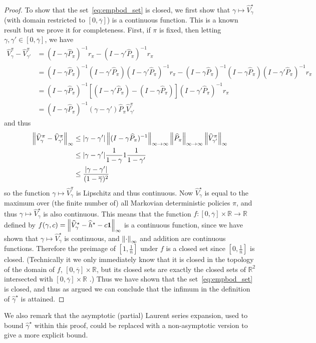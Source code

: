 \documentclass{article}
\theoremstyle{plain}
\theoremstyle{plain}
\theoremstyle{remark}
\theoremstyle{plain}
\theoremstyle{plain}
\newcommand{\R}{\mathbb{R}}
\newcommand{\Phat}{\widehat{P}}
\newcommand{\Vhat}{\widehat{V}}
\newcommand{\one}{\mathbf{1}}
\newcommand{\hhat}{\widehat{h}}
\newcommand{\empbod}{\widehat{\gamma}^\star}
\begin{document}
\begin{proof}
        To show that the set~\eqref{eq:empbod_set} is closed, we first show that $\gamma \mapsto \Vhat^\star_\gamma$ (with domain restricted to $[0, \overline{\gamma}]$) is a continuous function. This is a known result but we prove it for completeness. First, if $\pi$ is fixed, then letting $\gamma, \gamma' \in [0, \overline{\gamma}]$, we have
        \begin{align*}
            \Vhat_\gamma^\pi -  \Vhat_{\gamma'}^\pi &= (I - \gamma \Phat_\pi)^{-1} r_\pi - (I - \gamma' \Phat_\pi)^{-1} r_\pi \\
            &= (I - \gamma \Phat_\pi)^{-1} (I - \gamma' \Phat_\pi) (I - \gamma' \Phat_\pi)^{-1} r_\pi - (I - \gamma \Phat_\pi)^{-1} (I - \gamma \Phat_\pi) (I - \gamma' \Phat_\pi)^{-1} r_\pi \\
            &= (I - \gamma \Phat_\pi)^{-1} \left[(I - \gamma' \Phat_\pi) - (I - \gamma \Phat_\pi) \right] (I - \gamma' \Phat_\pi)^{-1} r_\pi \\
            &= (I - \gamma \Phat_\pi)^{-1} (\gamma - \gamma') \Phat_\pi \Vhat_{\gamma'}^\pi
        \end{align*}
        and thus
        \begin{align*}
            \infnorm{\Vhat_\gamma^\pi -  \Vhat_{\gamma'}^\pi} &\leq |\gamma - \gamma'| \infinfnorm{(I - \gamma \Phat_\pi)^{-1}} \infinfnorm{\Phat_\pi} \infnorm{\Vhat_{\gamma'}^\pi} \\
            &\leq |\gamma - \gamma'| \frac{1}{1-\gamma} 1 \frac{1}{1-\gamma'} \\
            & \leq \frac{|\gamma - \gamma'|}{(1-\overline{\gamma})^2}
        \end{align*}
        so the function $\gamma \mapsto \Vhat_\gamma^\pi$ is Lipschitz and thus continuous. Now $\Vhat^\star_\gamma$ is equal to the maximum over (the finite number of) all Markovian deterministic policies $\pi$, and thus $\gamma \mapsto \Vhat^\star_\gamma$ is also continuous. This means that the function $f : [0, \overline{\gamma}] \times \R \to \R$ defined by $f(\gamma, c) = \infnorm{\Vhat^\star_\gamma - \hhat^\star - c \one}$ is a continuous function, since we have shown that $\gamma \mapsto \Vhat^\star_\gamma$ is continuous, and $\left\Vert \cdot\right\Vert _{\infty}$ and addition are continuous functions. 
        Therefore the preimage of $[1, \frac{1}{n}]$ under $f$ is a closed set since $[0, \frac{1}{n}]$ is closed. (Technically it we only immediately know that it is closed in the topology of the domain of $f $, $[0, \overline{\gamma}] \times \R$, but its closed sets are exactly the closed sets of $\R^2$ intersected with $[0, \overline{\gamma}] \times \R$ \cite{pugh_real_2015}.) Thus we have shown that the set~\eqref{eq:empbod_set} is closed, and thus as argued we can conclude that the infimum in the definition of $\empbod$ is attained.
\end{proof}
We also remark that the asymptotic (partial) Laurent series expansion, used to bound $\empbod$ within this proof, could be replaced with a non-asymptotic version to give a more explicit bound.
\end{document}

